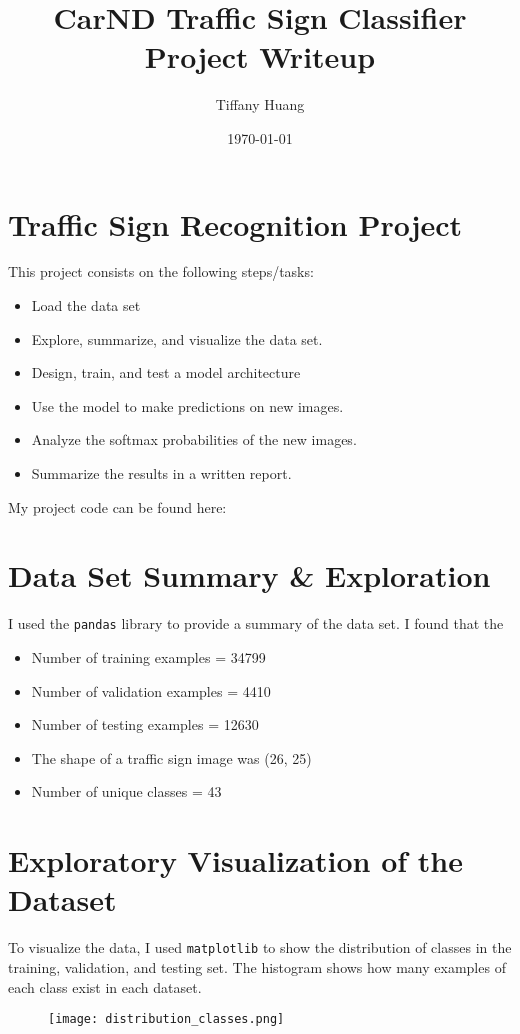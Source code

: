 \documentclass[12pt]{article}
\title{CarND Traffic Sign Classifier Project Writeup}
\author{Tiffany Huang}
\date{\today}
\begin{document}
\maketitle


\section{Traffic Sign Recognition Project}
This project consists on the following steps/tasks:
\begin{itemize}
\item{Load the data set}
\item {Explore, summarize, and visualize the data set.}
\item {Design, train, and test a model architecture}
\item {Use the model to make predictions on new images.}
\item {Analyze the softmax probabilities of the new images.}
\item {Summarize the results in a written report.}
\end{itemize}
My project code can be found here:

\section{Data Set Summary \& Exploration}
I used the \texttt{pandas} library to provide a summary of the data set. I found that the
\begin{itemize}
\item {Number of training examples = 34799}
\item {Number of validation examples = 4410}
\item {Number of testing examples = 12630}
\item {The shape of a traffic sign image was (26, 25)}
\item {Number of unique classes = 43}
\end{itemize}

\section{Exploratory Visualization of the Dataset}
To visualize the data, I used \texttt{matplotlib} to show the distribution of classes in the training, validation, and testing set. The histogram shows how many examples of each class exist in each dataset.
\begin{figure}[!h]
\texttt{[image: distribution\_classes.png]}
\end{figure}
\end{document}
